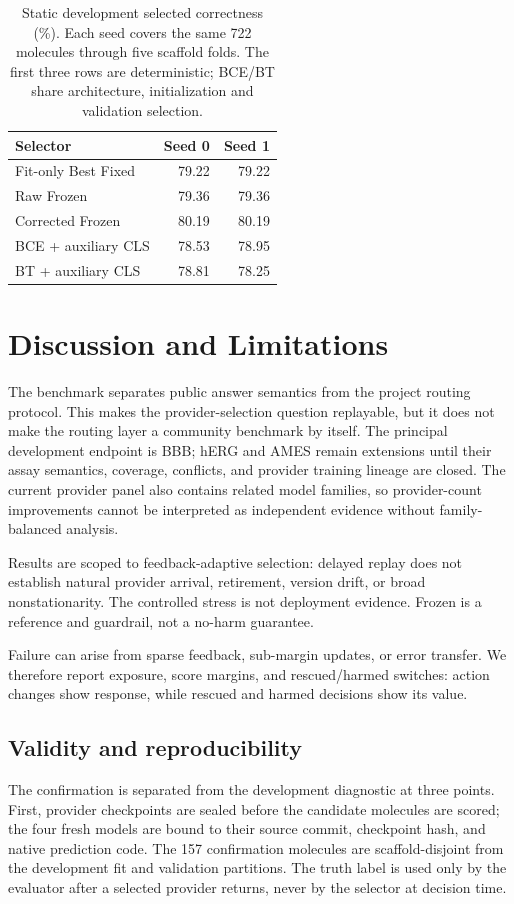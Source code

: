 \documentclass[sigconf,anonymous]{aamas}
\begin{document}
\begin{table}[t]
\caption{Static development selected correctness (\%). Each seed covers the same 722 molecules through five scaffold folds. The first three rows are deterministic; BCE/BT share architecture, initialization and validation selection.}
\label{tab:learned-prior}
\centering
\small
\begin{tabular}{@{}lrr@{}}
\toprule
Selector & Seed 0 & Seed 1 \\
\midrule
Fit-only Best Fixed & 79.22 & 79.22 \\
Raw Frozen & 79.36 & 79.36 \\
Corrected Frozen & 80.19 & 80.19 \\
BCE + auxiliary CLS & 78.53 & 78.95 \\
BT + auxiliary CLS & 78.81 & 78.25 \\
\bottomrule
\end{tabular}
\end{table}

\section{Discussion and Limitations}
The benchmark separates public answer semantics from the project routing protocol. This makes the provider-selection question replayable, but it does not make the routing layer a community benchmark by itself. The principal development endpoint is BBB; hERG and AMES remain extensions until their assay semantics, coverage, conflicts, and provider training lineage are closed. The current provider panel also contains related model families, so provider-count improvements cannot be interpreted as independent evidence without family-balanced analysis.

Results are scoped to feedback-adaptive selection: delayed replay does not establish natural provider arrival, retirement, version drift, or broad nonstationarity. The controlled stress is not deployment evidence. Frozen is a reference and guardrail, not a no-harm guarantee.

Failure can arise from sparse feedback, sub-margin updates, or error transfer. We therefore report exposure, score margins, and rescued/harmed switches: action changes show response, while rescued and harmed decisions show its value.

\subsection{Validity and reproducibility}
The confirmation is separated from the development diagnostic at three points. First, provider checkpoints are sealed before the candidate molecules are scored; the four fresh models are bound to their source commit, checkpoint hash, and native prediction code. The 157 confirmation molecules are scaffold-disjoint from the development fit and validation partitions. The truth label is used only by the evaluator after a selected provider returns, never by the selector at decision time.
\end{document}
